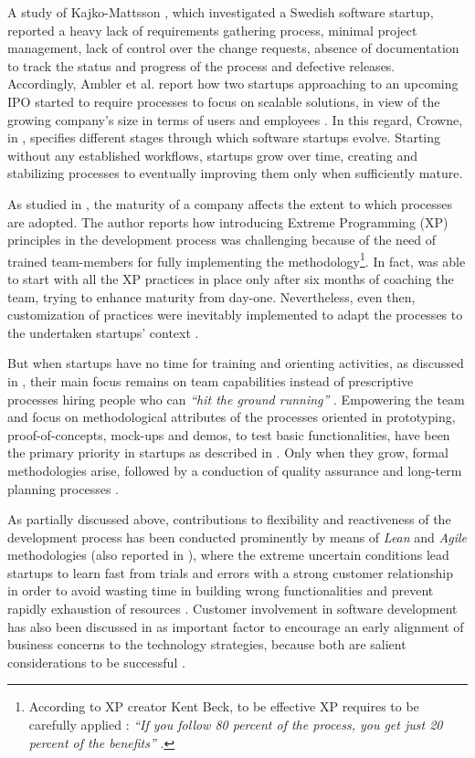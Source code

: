 \documentclass[final,5p,times,twocolumn]{elsarticle}
\begin{document}
A study of Kajko-Mattsson  \cite{Kajko-Mattsson2008}, which investigated a Swedish software startup, reported a heavy lack of requirements gathering process, minimal project management, lack of control over the change requests, absence of documentation to track the status and progress of the process and defective releases. Accordingly, Ambler et al. report how two startups approaching to an upcoming IPO started to require processes to focus on scalable solutions, in view of the growing company’s size in terms of users and employees \cite{Ambler2002}. In this regard, Crowne, in \cite{Crowne2002}, specifies different stages through which software startups evolve. Starting without any established workflows, startups grow over time, creating and stabilizing processes to eventually improving them only when sufficiently mature.

As studied in \cite{Tingling2007}, the maturity of a company affects the extent to which processes are adopted. The author reports how introducing Extreme Programming (XP) principles \cite{Beck:2004:EPE:1076267} in the development process was challenging because of the need of trained team-members for fully implementing the methodology\footnote{According to XP creator Kent Beck, to be effective XP requires to be carefully applied :  \textit{``If you follow 80 percent of the process, you get just 20 percent of the benefits''} \cite{Beck:2004:EPE:1076267}.}. In fact, \cite{Silva2005} was able to start with all the XP practices in place only after six months of coaching the team, trying to enhance maturity from day-one. Nevertheless, even then, customization of practices were inevitably implemented to adapt the processes to the undertaken startups’ context \cite{Deias}.

But when startups have no time for training and orienting activities, as discussed in \cite{Sutton2000}, their main focus remains on team capabilities instead of prescriptive processes hiring people who can \textit{``hit the ground running''} \cite{Yoffie1999}. Empowering the team and focus on methodological attributes of the processes oriented in prototyping, proof-of-concepts, mock-ups and demos, to test basic functionalities, have been the primary priority in startups as described in \cite{Camel1994a}. Only when they grow, formal methodologies arise, followed by a conduction of quality assurance and long-term planning processes \cite{Yoffie1999}.

As partially discussed above, contributions to flexibility and reactiveness of the development process has been conducted prominently by means of \textit{Lean} \cite{Gautam2008} and \textit{Agile} \cite{Abrahamsson2002} methodologies (also reported in \cite{Taipale2010, Kuvinka2011}), where the extreme uncertain conditions lead startups to learn fast from trials and errors with a strong customer relationship in order to avoid wasting time in building wrong functionalities and prevent rapidly exhaustion of resources \cite{Midler2008, Hilmola2003, Sutton2000}. Customer involvement in software development has also been discussed in  \cite{Yogendra2002} as important factor to encourage an early alignment of business concerns to the technology strategies, because both are salient considerations to be successful \cite{Tingling2007}.
\end{document}

